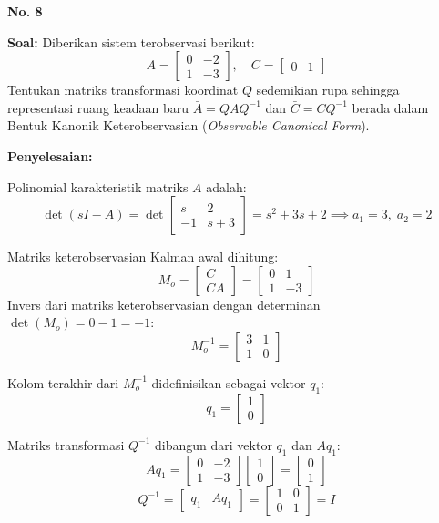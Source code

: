 \documentclass[11pt,a4paper]{article}
\begin{document}
\textbf{\large No. 8}

\textbf{Soal:}  
Diberikan sistem terobservasi berikut:
$$A = \begin{bmatrix} 0 & -2 \\ 1 & -3 \end{bmatrix}, \quad C = \begin{bmatrix} 0 & 1 \end{bmatrix}$$
Tentukan matriks transformasi koordinat $Q$ sedemikian rupa sehingga representasi ruang keadaan baru $\bar{A} = Q A Q^{-1}$ dan $\bar{C} = C Q^{-1}$ berada dalam Bentuk Kanonik Keterobservasian (\textit{Observable Canonical Form}).

\textbf{Penyelesaian:}

Polinomial karakteristik matriks $A$ adalah:
$$\det(sI - A) = \det \begin{bmatrix} s & 2 \\ -1 & s + 3 \end{bmatrix} = s^2 + 3s + 2 \implies a_1 = 3, \; a_2 = 2$$

Matriks keterobservasian Kalman awal dihitung:
$$M_o = \begin{bmatrix} C \\ CA \end{bmatrix} = \begin{bmatrix} 0 & 1 \\ 1 & -3 \end{bmatrix}$$
Invers dari matriks keterobservasian dengan determinan $\det(M_o) = 0 - 1 = -1$:
$$M_o^{-1} = \begin{bmatrix} 3 & 1 \\ 1 & 0 \end{bmatrix}$$

Kolom terakhir dari $M_o^{-1}$ didefinisikan sebagai vektor $q_1$:
$$q_1 = \begin{bmatrix} 1 \\ 0 \end{bmatrix}$$

Matriks transformasi $Q^{-1}$ dibangun dari vektor $q_1$ dan $A q_1$:
$$A q_1 = \begin{bmatrix} 0 & -2 \\ 1 & -3 \end{bmatrix} \begin{bmatrix} 1 \\ 0 \end{bmatrix} = \begin{bmatrix} 0 \\ 1 \end{bmatrix}$$
$$Q^{-1} = \begin{bmatrix} q_1 & A q_1 \end{bmatrix} = \begin{bmatrix} 1 & 0 \\ 0 & 1 \end{bmatrix} = I$$
\end{document}
